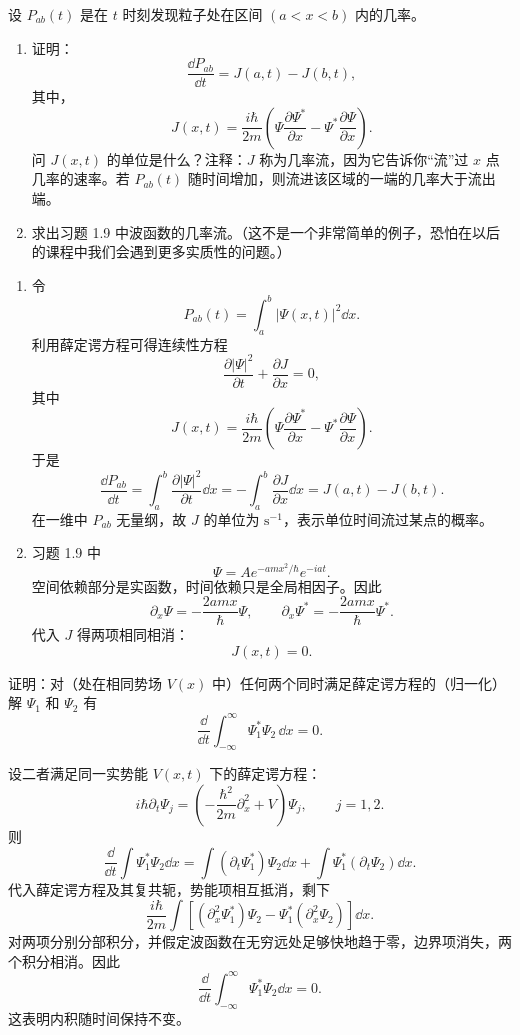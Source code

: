 \begin{question}
设 $P_{ab}(t)$ 是在 $t$ 时刻发现粒子处在区间 $(a<x<b)$ 内的几率。
\begin{enumerate}
\item 证明：
\[
\frac{\dd P_{ab}}{\dd t}=J(a,t)-J(b,t),
\]
其中，
\[
J(x,t)=\frac{i\hbar}{2m}\left(\Psi\frac{\partial\Psi^*}{\partial x}-\Psi^*\frac{\partial\Psi}{\partial x}\right).
\]
问 $J(x,t)$ 的单位是什么？注释：$J$ 称为几率流，因为它告诉你“流”过 $x$ 点几率的速率。若 $P_{ab}(t)$ 随时间增加，则流进该区域的一端的几率大于流出端。
\item 求出习题 1.9 中波函数的几率流。（这不是一个非常简单的例子，恐怕在以后的课程中我们会遇到更多实质性的问题。）
\end{enumerate}
\end{question}
\begin{solution}
\begin{enumerate}
\item 令
\[
P_{ab}(t)=\int_a^b |\Psi(x,t)|^2\dd x.
\]
利用薛定谔方程可得连续性方程
\[
\frac{\partial |\Psi|^2}{\partial t}+\frac{\partial J}{\partial x}=0,
\]
其中
\[
J(x,t)=\frac{i\hbar}{2m}\left(\Psi\frac{\partial\Psi^*}{\partial x}
-\Psi^*\frac{\partial\Psi}{\partial x}\right).
\]
于是
\[
\frac{\dd P_{ab}}{\dd t}=\int_a^b\frac{\partial |\Psi|^2}{\partial t}\dd x
=-\int_a^b\frac{\partial J}{\partial x}\dd x
=J(a,t)-J(b,t).
\]
在一维中 $P_{ab}$ 无量纲，故 $J$ 的单位为 $\mathrm{s}^{-1}$，表示单位时间流过某点的概率。
\item 习题 1.9 中
\[
\Psi=Ae^{-amx^2/\hbar}e^{-iat}.
\]
空间依赖部分是实函数，时间依赖只是全局相因子。因此
\[
\partial_x\Psi=-\frac{2amx}{\hbar}\Psi,
\qquad
\partial_x\Psi^*=-\frac{2amx}{\hbar}\Psi^*.
\]
代入 $J$ 得两项相同相消：
\[
J(x,t)=0.
\]
\end{enumerate}
\end{solution}

\begin{question}
证明：对（处在相同势场 $V(x)$ 中）任何两个同时满足薛定谔方程的（归一化）解 $\Psi_1$ 和 $\Psi_2$ 有
\[
\frac{\dd}{\dd t}\int_{-\infty}^{\infty}\Psi_1^*\Psi_2\,\dd x=0.
\]
\end{question}
\begin{solution}
设二者满足同一实势能 $V(x,t)$ 下的薛定谔方程：
\[
i\hbar\partial_t\Psi_j=\left(-\frac{\hbar^2}{2m}\partial_x^2+V\right)\Psi_j,
\qquad j=1,2.
\]
则
\[
\frac{\dd}{\dd t}\int\Psi_1^*\Psi_2\dd x
=\int (\partial_t\Psi_1^*)\Psi_2\dd x+
\int\Psi_1^*(\partial_t\Psi_2)\dd x.
\]
代入薛定谔方程及其复共轭，势能项相互抵消，剩下
\[
\frac{i\hbar}{2m}\int \left[(\partial_x^2\Psi_1^*)\Psi_2-
\Psi_1^*(\partial_x^2\Psi_2)\right]\dd x.
\]
对两项分别分部积分，并假定波函数在无穷远处足够快地趋于零，边界项消失，两个积分相消。因此
\[
\frac{\dd}{\dd t}\int_{-\infty}^{\infty}\Psi_1^*\Psi_2\dd x=0.
\]
这表明内积随时间保持不变。
\end{solution}


